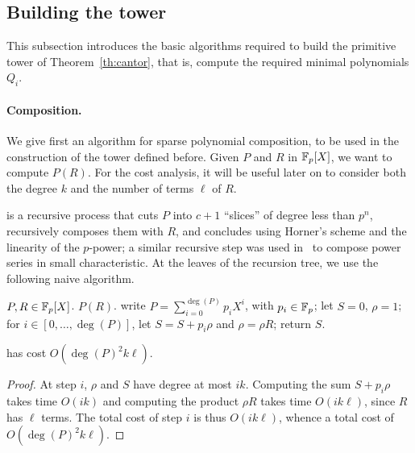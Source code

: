 

\subsection{Building the tower}

This subsection introduces the basic algorithms required to build the
primitive tower of Theorem~\ref{th:cantor}, that is, compute the
required minimal polynomials $Q_i$.

\paragraph{Composition.} We give first an algorithm for sparse
polynomial composition, to be used in the construction of the tower
defined before.  Given $P$ and $R$ in $\mathbb{F}_p[X]$, we want to compute
$P(R)$. For the cost analysis, it will be useful later on to consider
both the degree $k$ and the number of terms $\ell$ of $R$.

\hyperref[alg:compose]{} is a recursive process that cuts
$P$ into $c+1$ ``slices'' of degree less than $p^n$, recursively
composes them with $R$, and concludes using Horner's scheme and the
linearity of the $p$-power; a similar recursive step was used
in~\cite{bernstein98} to compose power series in small characteristic.
At the leaves of the recursion tree, we use the following naive
algorithm.

\begin{algorithm}
  \caption{\label{alg:naivecompose}}
  \begin{algorithmic}[1]
    \REQUIRE $P,R\in\mathbb{F}_p[X]$.
    \ENSURE $P(R)$.
    \STATE write $P=\sum_{i=0}^{\deg(P)} p_i X^{i}$, with $p_i \in \mathbb{F}_p$;
    \STATE let $S=0$, $\rho=1$;
    \STATE for $i\in [0,\dots,\deg(P)]$, let $S=S+p_i \rho$ and $\rho =\rho R$;
    \STATE return $S$.
  \end{algorithmic}
\end{algorithm}

\begin{lemma}
  \hyperref[alg:naivecompose]{} has cost $O(\deg(P)^2k\ell)$.  
\end{lemma}
\begin{proof} At step $i$, $\rho$ and $S$ have degree at most
$ik$. Computing the sum $S + p_i \rho$ takes time $O(ik)$ and
computing the product $\rho R$ takes time $O(ik\ell)$, since $R$ has
$\ell$ terms. The total cost of step $i$ is thus $O(ik\ell)$, 
whence a total cost of $O(\deg(P)^2 k\ell)$.
\end{proof}


